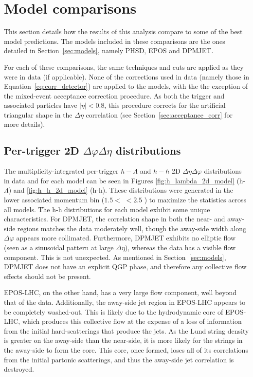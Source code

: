 \section{Model comparisons}
\label{sec:model_comparisons}
This section details how the results of this analysis compare to some of the best \pPb model predictions. The models included in these comparisons are the ones detailed in Section~\ref{sec:models}, namely PHSD, EPOS and DPMJET.

For each of these comparisons, the same techniques and cuts are applied as they were in data (if applicable).  None of the corrections used in data (namely those in Equation~\ref{eq:corr_detector}) are applied to the models, with the the exception of the mixed-event acceptance correction procedure. As both the trigger and associated particles have $|\eta| < 0.8$, this procedure corrects for the artificial triangular shape in the $\Delta\eta$ correlation (see Section~\ref{sec:acceptance_corr} for more details).

\subsection{Per-trigger 2D $\Delta\varphi\Delta\eta$ distributions}
\label{sec:model_2d_correlations}

The multiplicity-integrated per-trigger $h-\Lambda$ and $h-h$ 2D $\Delta\eta\Delta\varphi$ distributions in data and for each model can be seen in Figures \ref{fig:h_lambda_2d_model} (h-$\Lambda$) and \ref{fig:h_h_2d_model} (h-h). These distributions were generated in the lower associated momentum bin ($1.5 <$ \pt $< 2.5$ \GeVc) to maximize the statistics across all models. The h-h distributions for each model exhibit some unique characteristics. For DPMJET, the correlation shape in both the near- and away-side regions matches the data moderately well, though the away-side width along $\Delta\varphi$ appears more collimated. Furthermore, DPMJET exhibits no elliptic flow (seen as a sinusoidal pattern at large $\Delta\eta$), whereas the data has a visible flow component. This is not unexpected. As mentioned in Section~\ref{sec:models}, DPMJET does not have an explicit QGP phase, and therefore any collective flow effects should not be present. 

EPOS-LHC, on the other hand, has a very large flow component, well beyond that of the data. Additionally, the away-side jet region in EPOS-LHC appears to be completely washed-out. This is likely due to the hydrodynamic core of EPOS-LHC, which produces this collective flow at the expense of a loss of information from the initial hard-scatterings that produce the jets. As the Lund string density is greater on the away-side than the near-side, it is more likely for the strings in the away-side to form the core. This core, once formed, loses all of its correlations from the initial partonic scatterings, and thus the away-side jet correlation is destroyed. 

